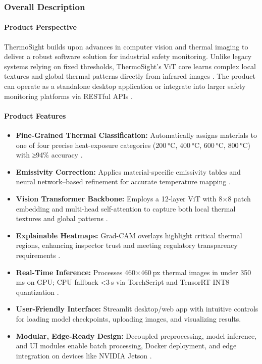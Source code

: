 \subsubsection{Overall Description}

\paragraph{Product Perspective}
ThermoSight builds upon advances in computer vision and thermal imaging to deliver a robust software solution for industrial safety monitoring. Unlike legacy systems relying on fixed thresholds, ThermoSight’s ViT core learns complex local textures and global thermal patterns directly from infrared images \cite{Dosovitskiy2021}. The product can operate as a standalone desktop application or integrate into larger safety monitoring platforms via RESTful APIs \cite{Staecker2021}.

\paragraph{Product Features}
\begin{itemize}[leftmargin=*]
    \item \textbf{Fine-Grained Thermal Classification:} Automatically assigns materials to one of four precise heat-exposure categories (200 °C, 400 °C, 600 °C, 800 °C) with ≥94\% accuracy \cite{Liu2024,Li2024}.
    \item \textbf{Emissivity Correction:} Applies material-specific emissivity tables and neural network–based refinement for accurate temperature mapping \cite{Schmid2025,Li2023}.
    \item \textbf{Vision Transformer Backbone:} Employs a 12-layer ViT with 8×8 patch embedding and multi-head self-attention to capture both local thermal textures and global patterns \cite{Dosovitskiy2021,Liu2024}.
    \item \textbf{Explainable Heatmaps:} Grad-CAM overlays highlight critical thermal regions, enhancing inspector trust and meeting regulatory transparency requirements \cite{Selvaraju2020,Chattopadhyay2018}.
    \item \textbf{Real-Time Inference:} Processes 460×460 px thermal images in under 350 ms on GPU; CPU fallback <3 s via TorchScript and TensorRT INT8 quantization \cite{Jacob2018,Staecker2021}.
    \item \textbf{User-Friendly Interface:} Streamlit desktop/web app with intuitive controls for loading model checkpoints, uploading images, and visualizing results.
    \item \textbf{Modular, Edge-Ready Design:} Decoupled preprocessing, model inference, and UI modules enable batch processing, Docker deployment, and edge integration on devices like NVIDIA Jetson \cite{Staecker2021}.
\end{itemize}


